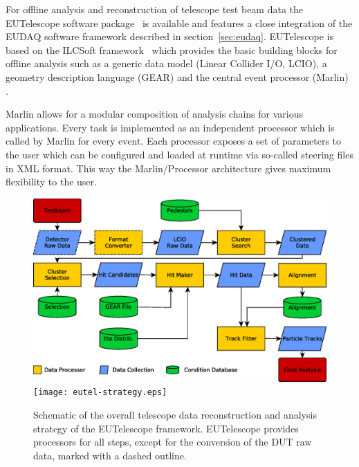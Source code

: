 
For offline analysis and reconstruction of telescope test beam data the EUTelescope software package~\cite{ref:eudetmemo_2010_12,ref:eutelwebsite}
 is available and features a close integration of the EUDAQ software framework described in section~\ref{sec:eudaq}.
EUTelescope is based on the ILCSoft framework~\cite{ref:eudetmemo_2009_12} which provides the basic building blocks for offline analysis such as a generic data model (Linear Collider I/O, LCIO),
a geometry description language (GEAR) and the central event processor (Marlin) \cite{ref:eudetreport_2007_11}.

Marlin allows for a modular composition of analysis chains for various applications. Every task is implemented as an independent processor which is called by Marlin for every event. 
Each processor exposes a set of parameters to the user which can be configured and loaded at runtime via so-called steering files in XML format.
This way the Marlin/Processor architecture gives maximum flexibility to the user.

\begin{figure}[tbp]
  \center
  \ifdefined\notFOREPJ
  \includegraphics[width=.9\textwidth]{figures/eutel-strategy.eps}
  \else
  \texttt{[image: eutel-strategy.eps]}
  \fi
  \caption[The EUTelescope data analysis strategy]{Schematic of the overall telescope data reconstruction and analysis strategy of the EUTelescope framework.
EUTelescope provides processors for all steps, except for the conversion of the DUT raw data, marked with a dashed outline.}
  \label{fig:offline:strategy}
\end{figure}

